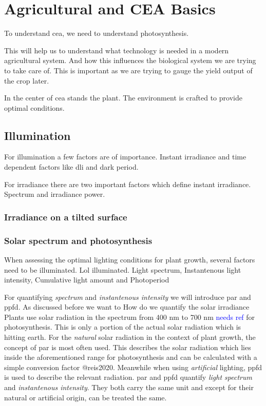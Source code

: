 
\section{Agricultural and CEA Basics}
\label{sec:fund-cea}
To understand \ac{cea}, we need to understand photosynthesis.

This will help us to understand what technology is needed in a modern agricultural system.
And how this influences the biological system we are trying to take care of.
This is important as we are trying to gauge the yield output of the crop later.

In the center of \ac{cea} stands the plant.
The environment is crafted to provide optimal conditions.

\subsection{Illumination}
For illumination a few factors are of importance.
Instant irradiance and time dependent factors like dli and dark period.

For irradiance there are two important factors which define instant irradiance.
Spectrum and irradiance power.
\subsubsection{Irradiance on a tilted surface}

\subsubsection{Solar spectrum and photosynthesis}
When assessing the optimal lighting conditions for plant growth, several factors need to be illuminated.
Lol illuminated.
Light spectrum, Instantenous light intensity, Cumulative light amount and Photoperiod

For quantifying \textit{spectrum} and \textit{instantenous intensity} we will introduce \ac{par} and \ac{ppfd}.
As discussed before we want to 
How do we quantify the solar irradiance 
Plants use solar radiation in the spectrum from 400 nm to 700 nm \textcolor{Blue}{needs ref} for photosynthesis.
This is only a portion of the actual solar radiation which is hitting earth.
For the \textit{natural} solar radiation in the context of plant growth, the concept of \ac{par} is most often used.
This describes the solar radiation which lies inside the aforementioned range for photosynthesis and can be calculated with a simple conversion factor @reis2020.
Meanwhile when using \textit{artificial} lighting, \ac{ppfd} is used to describe the relevant radiation.
\ac{par} and \ac{ppfd} quantify \textit{light spectrum} and \textit{instantenous intensity}.
They both carry the same unit and except for their natural or artificial origin, can be treated the same.

